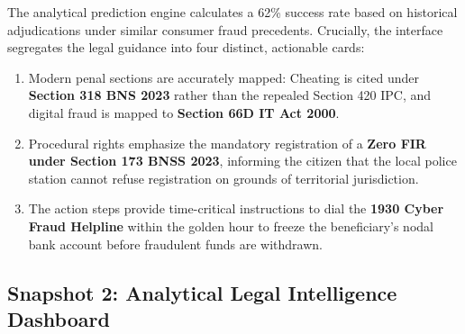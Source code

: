The analytical prediction engine calculates a 62\% success rate based on historical adjudications under similar consumer fraud precedents. Crucially, the interface segregates the legal guidance into four distinct, actionable cards:
\begin{enumerate}
    \item Modern penal sections are accurately mapped: Cheating is cited under \textbf{Section 318 BNS 2023} rather than the repealed Section 420 IPC, and digital fraud is mapped to \textbf{Section 66D IT Act 2000}.
    \item Procedural rights emphasize the mandatory registration of a \textbf{Zero FIR under Section 173 BNSS 2023}, informing the citizen that the local police station cannot refuse registration on grounds of territorial jurisdiction.
    \item The action steps provide time-critical instructions to dial the \textbf{1930 Cyber Fraud Helpline} within the golden hour to freeze the beneficiary's nodal bank account before fraudulent funds are withdrawn.
\end{enumerate}

\subsection{Snapshot 2: Analytical Legal Intelligence Dashboard}

